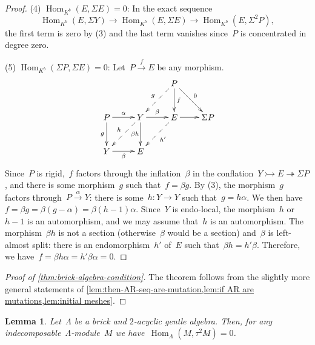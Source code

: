 \documentclass{amsart}
\newtheorem{lemma}[theorem]{Lemma}
\theoremstyle{definition}
\newcommand{\Hom}[1]{\operatorname{Hom}_{#1}}
\newcommand{\susp}{\Sigma}
\newcommand{\infl}{\rightarrowtail}
\newcommand{\defl}{\twoheadrightarrow}
\begin{document}
\begin{proof}
(4) $\Hom{K^b}(E,\susp E)=0$: In the exact sequence
\[
 \Hom{K^b}(E,\susp Y) \to \Hom{K^b}(E, \susp E) \to \Hom{K^b}(E,\susp^2 P),
\]
the first term is zero by (3) and the last term vanishes since~$P$ is concentrated in degree zero.

(5) $\Hom{K^b}(\susp P,\susp E)= 0$:
Let~$P\xrightarrow{f} E$ be any morphism.
\[
\xy
%
(7,14)*+{P}="P";
%
(-21,0)*+{P}="0";
(-7,0)*+{Y}="2";
(7,0)*+{E}="4";
(21,0)*+{\susp P}="6";
%
(-21,-14)*+{Y}="Y";
(-7,-14)*+{E}="E";
%
{\ar^f "P";"4"};
{\ar^0 "P";"6"};
{\ar@{-->}_g "P";"2"};
%
{\ar^\alpha "0";"2"};
{\ar^\beta "2";"4"};
{\ar "4";"6"};
%
{\ar_g "0";"Y"};
{\ar@{-->}_h "2";"Y"};
{\ar_\beta "Y";"E"};
{\ar_{\beta h\!} "2";"E"};
{\ar@{-->}^{h'} "4";"E"};
\endxy
\]
Since~$P$ is rigid,~$f$ factors through the inflation~$\beta$ in the conflation~$Y\infl E\defl \susp P$, and there is some morphism~$g$ such that~$f=\beta g$.
By (3), the morphism~$g$ factors through~$P \xrightarrow{\alpha} Y$: there is some~$h:Y\to Y$ such that~$g= h \alpha$.
We then have~$f = \beta g = \beta (g-\alpha) = \beta (h-1) \alpha$.
Since~$Y$ is endo-local, the morphism~$h$ or~$h-1$ is an automorphism, and we may assume that~$h$ is an automorphism.
The morphism~$\beta h$ is not a section (otherwise~$\beta$ would be a section) and~$\beta$ is left-almost split: there is an endomorphism~$h'$ of~$E$ such that~$\beta h = h'\beta$.
Therefore, we have~$f=\beta h \alpha = h'\beta\alpha = 0$.
\end{proof}

\begin{proof}[Proof of \cref{thm:brick-algebra-condition}]
The theorem follows from the slightly more general statements of \cref{lem:then-AR-seq-are-mutation,lem:if AR are mutations,lem:initial meshes}.
\end{proof}


\begin{lemma}
\label{lem:characterization Gentle 2-acyclic}
Let~$\Lambda$ be a brick and $2$-acyclic gentle algebra.
Then, for any indecomposable~$\Lambda$-module~$M$ we have~$\Hom{\Lambda}(M,\tau^2 M)=0$.
\end{lemma}
\end{document}
